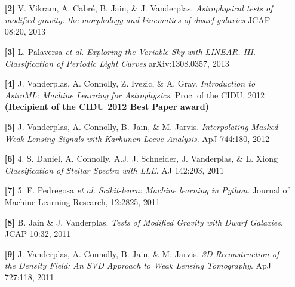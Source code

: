 \documentclass{article} %
\def\bf{\bfseries}
\def\sf{\sffamily}
\def\sl{\slshape}
\newlength\sidebarwidth
\newcommand{\subtopic}[3][]
	 {\begin{minipage}{\textwidth}
	 \vspace*{.4\baselineskip}
         \nopagebreak\hspace{0in}%
         \nopagebreak\begin{minipage}[t]{\sidebarwidth - .2cm}
         \raggedleft {\sf\fontseries{sbc}\selectfont #2}
         {\\[-0.2\baselineskip] \textcolor{gray}{\footnotesize #1}}
	 \end{minipage}%
	 \hfill
	 \begin{minipage}[t]{\linewidth - \sidebarwidth}
	 #3%
	 \end{minipage}%
	 \vspace*{.2\baselineskip plus 1\baselineskip minus
	 .2\baselineskip}%
	 \end{minipage}}
\begin{document}
\subtopic{\hspace*{-3ex} Articles}{~ 
  \begin{itemize}[leftmargin=0ex, itemsep=0ex, parsep=.5ex, labelindent=-4ex]

    \item[{\bf \textcolor{myblue}{[2]}}]
      V. Vikram, A. Cabr\'{e}, B. Jain, \& J. Vanderplas.
      {\it Astrophysical tests of modified gravity:
        the morphology and kinematics of dwarf galaxies}
      JCAP 08:20, 2013

    \item[{\bf \textcolor{myblue}{[3]}}]
      L. Palaversa {\sl et al.}
      {\sl Exploring the Variable Sky with LINEAR. III.
        Classification of Periodic Light Curves}
      arXiv:1308.0357, 2013
 
    \item[{\bf \textcolor{myblue}{[4]}}]
      J. Vanderplas, A. Connolly, Z. Ivezic, \& A. Gray.
      {\sl Introduction to AstroML: Machine Learning for Astrophysics}.
      Proc. of the CIDU, 2012
      {\bf (Recipient of the CIDU 2012 Best Paper award)}

    \item[{\bf \textcolor{myblue}{[5]}}]
      J. Vanderplas, A. Connolly, B. Jain, \& M. Jarvis.
      {\it Interpolating Masked Weak Lensing Signals with Karhunen-Loeve
        Analysis}.
      ApJ 744:180, 2012

    \item[{\bf \textcolor{myblue}{[6]}}]
      4. S. Daniel, A. Connolly, A.J. J. Schneider, J. Vanderplas, \& L. Xiong
      {\sl Classification of Stellar Spectra with LLE}.
      AJ 142:203, 2011

    \item[{\bf \textcolor{myblue}{[7]}}]
      5. F. Pedregosa {\sl et al.}
      {\sl Scikit-learn: Machine learning in Python}.
      Journal of Machine Learning Research, 12:2825, 2011

    \item[{\bf \textcolor{myblue}{[8]}}]
      B. Jain \& J. Vanderplas.
      {\sl Tests of Modified Gravity with Dwarf Galaxies}.
      JCAP 10:32, 2011

    \item[{\bf \textcolor{myblue}{[9]}}]
      J. Vanderplas, A. Connolly, B. Jain, \& M. Jarvis.
      {\sl 3D Reconstruction of the Density Field: An SVD Approach
        to Weak Lensing Tomography}.
      ApJ 727:118, 2011


\end{itemize}}
\end{document}
